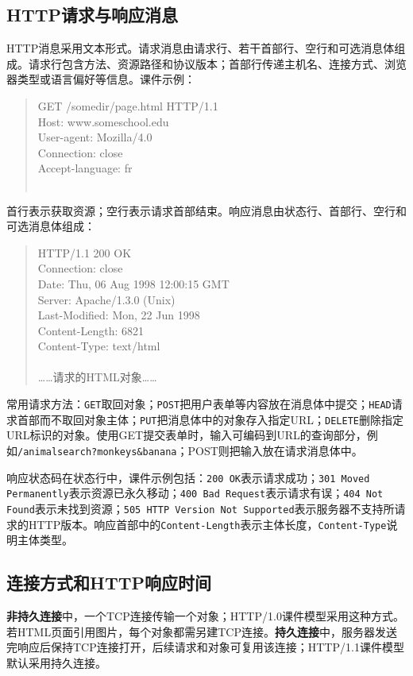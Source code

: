 \subsection{HTTP请求与响应消息}
HTTP消息采用文本形式。请求消息由请求行、若干首部行、空行和可选消息体组成。请求行包含方法、资源路径和协议版本；首部行传递主机名、连接方式、浏览器类型或语言偏好等信息。课件示例：
\begin{quote}\small\ttfamily
GET /somedir/page.html HTTP/1.1\\
Host: www.someschool.edu\\
User-agent: Mozilla/4.0\\
Connection: close\\
Accept-language: fr\\
\\
\end{quote}
首行表示获取资源；空行表示请求首部结束。响应消息由状态行、首部行、空行和可选消息体组成：
\begin{quote}\small\ttfamily
HTTP/1.1 200 OK\\
Connection: close\\
Date: Thu, 06 Aug 1998 12:00:15 GMT\\
Server: Apache/1.3.0 (Unix)\\
Last-Modified: Mon, 22 Jun 1998\\
Content-Length: 6821\\
Content-Type: text/html\\
\\
……请求的HTML对象……
\end{quote}

常用请求方法：\texttt{GET}取回对象；\texttt{POST}把用户表单等内容放在消息体中提交；\texttt{HEAD}请求首部而不取回对象主体；\texttt{PUT}把消息体中的对象存入指定URL；\texttt{DELETE}删除指定URL标识的对象。使用GET提交表单时，输入可编码到URL的查询部分，例如\texttt{/animalsearch?monkeys\&banana}；POST则把输入放在请求消息体中。

响应状态码在状态行中，课件示例包括：\texttt{200 OK}表示请求成功；\texttt{301 Moved Permanently}表示资源已永久移动；\texttt{400 Bad Request}表示请求有误；\texttt{404 Not Found}表示未找到资源；\texttt{505 HTTP Version Not Supported}表示服务器不支持所请求的HTTP版本。响应首部中的\texttt{Content-Length}表示主体长度，\texttt{Content-Type}说明主体类型。

\subsection{连接方式和HTTP响应时间}
\textbf{非持久连接}中，一个TCP连接传输一个对象；HTTP/1.0课件模型采用这种方式。若HTML页面引用图片，每个对象都需另建TCP连接。\textbf{持久连接}中，服务器发送完响应后保持TCP连接打开，后续请求和对象可复用该连接；HTTP/1.1课件模型默认采用持久连接。


